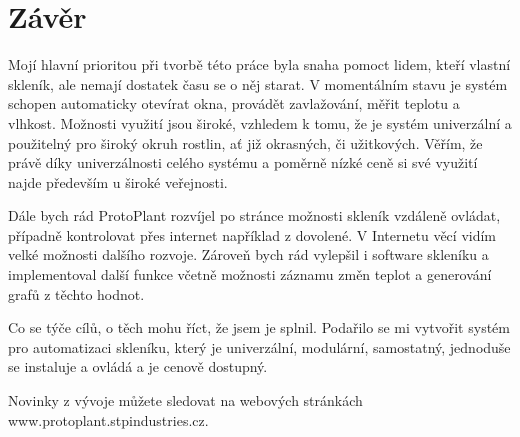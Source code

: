 \chapter*{Závěr}

Mojí hlavní prioritou při tvorbě této práce byla snaha pomoct lidem, kteří vlastní skleník, ale nemají dostatek času se o něj starat.
V momentálním stavu je systém schopen automaticky otevírat okna, provádět zavlažování, měřit teplotu a vlhkost.
Možnosti využití jsou široké, vzhledem k tomu, že je systém univerzální a použitelný pro široký okruh rostlin, ať již okrasných, či užitkových.
Věřím, že právě díky univerzálnosti celého systému a poměrně nízké ceně si své využití najde především u široké veřejnosti.

Dále bych rád ProtoPlant rozvíjel po stránce možnosti skleník vzdáleně ovládat, případně kontrolovat přes internet například z dovolené.
V Internetu věcí vidím velké možnosti dalšího rozvoje.
Zároveň bych rád vylepšil i software skleníku a implementoval další funkce včetně možnosti záznamu změn teplot a generování grafů z těchto hodnot.

Co se týče cílů, o těch mohu říct, že jsem je splnil.
Podařilo se mi vytvořit systém pro automatizaci skleníku, který je univerzální, modulární, samostatný, jednoduše se instaluje a ovládá a je cenově dostupný.

Novinky z vývoje můžete sledovat na webových stránkách \\ www.protoplant.stpindustries.cz.

	

